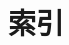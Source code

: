 \documentclass[11pt,a4paper,twoside,openright,scheme=chinese]{ctexbook}
\begin{document}
% 

\newpage
\chapter*{索引}
\begingroup  
\begin{multicols}{2} %
\printindex %
\end{multicols}  
\endgroup  
% 
\end{document}
